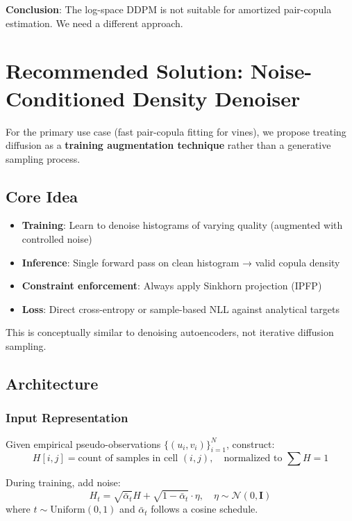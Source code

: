 \documentclass[11pt]{article}
\begin{document}
\textbf{Conclusion}: The log-space DDPM is not suitable for amortized pair-copula estimation. We need a different approach.

\section{Recommended Solution: Noise-Conditioned Density Denoiser}

For the primary use case (fast pair-copula fitting for vines), we propose treating diffusion as a \textbf{training augmentation technique} rather than a generative sampling process.

\subsection{Core Idea}

\begin{itemize}
    \item \textbf{Training}: Learn to denoise histograms of varying quality (augmented with controlled noise)
    \item \textbf{Inference}: Single forward pass on clean histogram → valid copula density
    \item \textbf{Constraint enforcement}: Always apply Sinkhorn projection (IPFP)
    \item \textbf{Loss}: Direct cross-entropy or sample-based NLL against analytical targets
\end{itemize}

This is conceptually similar to denoising autoencoders, not iterative diffusion sampling.

\subsection{Architecture}

\subsubsection{Input Representation}

Given empirical pseudo-observations $\{(u_i, v_i)\}_{i=1}^N$, construct:
\begin{equation}
H[i,j] = \text{count of samples in cell } (i,j), \quad \text{normalized to } \sum H = 1
\end{equation}

During training, add noise:
\begin{equation}
H_t = \sqrt{\bar{\alpha}_t} H + \sqrt{1-\bar{\alpha}_t} \cdot \eta, \quad \eta \sim \mathcal{N}(0, \mathbf{I})
\end{equation}
where $t \sim \text{Uniform}(0,1)$ and $\bar{\alpha}_t$ follows a cosine schedule.
\end{document}
